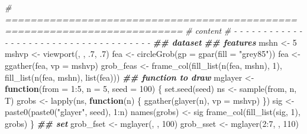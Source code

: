 \documentclass[
]{article}
\newenvironment{Shaded}{\begin{snugshade}}{\end{snugshade}}
\newcommand{\AttributeTok}[1]{\textcolor[rgb]{0.77,0.63,0.00}{#1}}
\newcommand{\CommentTok}[1]{\textcolor[rgb]{0.56,0.35,0.01}{\textit{#1}}}
\newcommand{\ControlFlowTok}[1]{\textcolor[rgb]{0.13,0.29,0.53}{\textbf{#1}}}
\newcommand{\DecValTok}[1]{\textcolor[rgb]{0.00,0.00,0.81}{#1}}
\newcommand{\DocumentationTok}[1]{\textcolor[rgb]{0.56,0.35,0.01}{\textbf{\textit{#1}}}}
\newcommand{\FunctionTok}[1]{\textcolor[rgb]{0.00,0.00,0.00}{#1}}
\newcommand{\NormalTok}[1]{#1}
\newcommand{\OtherTok}[1]{\textcolor[rgb]{0.56,0.35,0.01}{#1}}
\newcommand{\SpecialCharTok}[1]{\textcolor[rgb]{0.00,0.00,0.00}{#1}}
\newcommand{\StringTok}[1]{\textcolor[rgb]{0.31,0.60,0.02}{#1}}
\begin{document}
\begin{Shaded}
\begin{Highlighting}[]
\CommentTok{\# ==========================================================================}
\CommentTok{\# content}
\CommentTok{\# {-} {-} {-} {-} {-} {-} {-} {-} {-} {-} {-} {-} {-} {-} {-} {-} {-} {-} {-} {-} {-} {-} {-} {-} {-} {-} {-} {-} {-} {-} {-} {-} {-} {-} {-} {-} {-}}
\DocumentationTok{\#\# dataset}
\DocumentationTok{\#\# features}
\NormalTok{mshn }\OtherTok{\textless{}{-}} \DecValTok{5}
\NormalTok{mshvp }\OtherTok{\textless{}{-}} \FunctionTok{viewport}\NormalTok{(, , .}\DecValTok{7}\NormalTok{, .}\DecValTok{7}\NormalTok{)}
\NormalTok{fea }\OtherTok{\textless{}{-}} \FunctionTok{circleGrob}\NormalTok{(}\AttributeTok{gp =} \FunctionTok{gpar}\NormalTok{(}\AttributeTok{fill =} \StringTok{"grey85"}\NormalTok{))}
\NormalTok{fea }\OtherTok{\textless{}{-}} \FunctionTok{ggather}\NormalTok{(fea, }\AttributeTok{vp =}\NormalTok{ mshvp)}
\NormalTok{grob\_feas }\OtherTok{\textless{}{-}} \FunctionTok{frame\_col}\NormalTok{(}\FunctionTok{fill\_list}\NormalTok{(}\FunctionTok{n}\NormalTok{(fea, mshn), }\DecValTok{1}\NormalTok{), }\FunctionTok{fill\_list}\NormalTok{(}\FunctionTok{n}\NormalTok{(fea, mshn), }\FunctionTok{list}\NormalTok{(fea)))}
\DocumentationTok{\#\# function to draw}
\NormalTok{mglayer }\OtherTok{\textless{}{-}} \ControlFlowTok{function}\NormalTok{(}\AttributeTok{from =} \DecValTok{1}\SpecialCharTok{:}\DecValTok{5}\NormalTok{, }\AttributeTok{n =} \DecValTok{5}\NormalTok{, }\AttributeTok{seed =} \DecValTok{100}\NormalTok{) \{}
  \FunctionTok{set.seed}\NormalTok{(seed)}
\NormalTok{  ns }\OtherTok{\textless{}{-}} \FunctionTok{sample}\NormalTok{(from, n, T)}
\NormalTok{  grobs }\OtherTok{\textless{}{-}} \FunctionTok{lapply}\NormalTok{(ns, }\ControlFlowTok{function}\NormalTok{(n) \{}
                    \FunctionTok{ggather}\NormalTok{(}\FunctionTok{glayer}\NormalTok{(n), }\AttributeTok{vp =}\NormalTok{ mshvp)}
\NormalTok{         \})}
\NormalTok{  sig }\OtherTok{\textless{}{-}} \FunctionTok{paste0}\NormalTok{(}\FunctionTok{paste0}\NormalTok{(}\StringTok{"glayer"}\NormalTok{, seed), }\DecValTok{1}\SpecialCharTok{:}\NormalTok{n)}
  \FunctionTok{names}\NormalTok{(grobs) }\OtherTok{\textless{}{-}}\NormalTok{ sig}
  \FunctionTok{frame\_col}\NormalTok{(}\FunctionTok{fill\_list}\NormalTok{(sig, }\DecValTok{1}\NormalTok{), grobs)}
\NormalTok{\}}
\DocumentationTok{\#\# set}
\NormalTok{grob\_fset }\OtherTok{\textless{}{-}} \FunctionTok{mglayer}\NormalTok{(, , }\DecValTok{100}\NormalTok{)}
\NormalTok{grob\_sset }\OtherTok{\textless{}{-}} \FunctionTok{mglayer}\NormalTok{(}\DecValTok{2}\SpecialCharTok{:}\DecValTok{7}\NormalTok{, , }\DecValTok{110}\NormalTok{)}

\end{Highlighting}
\end{Shaded}
\end{document}
